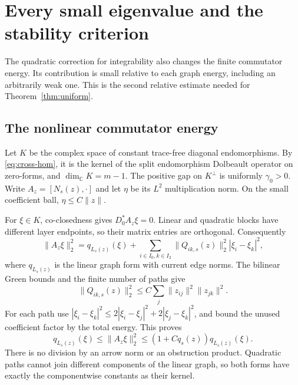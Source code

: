 \documentclass[11pt]{amsart}
\theoremstyle{definition}
\theoremstyle{remark}
\newcommand{\CC}{\mathbb C}
\begin{document}
\section{Every small eigenvalue and the stability criterion}\label{sec:spectrum}

The quadratic correction for integrability also changes the finite
commutator energy. Its contribution is small relative to each graph
energy, including an arbitrarily weak one. This is the second relative
estimate needed for Theorem~\ref{thm:uniform}.

\subsection{The nonlinear commutator energy}
Let $K$ be the complex space of constant trace-free diagonal
endomorphisms. By \eqref{eq:cross-hom}, it is the kernel of the split
endomorphism Dolbeault operator on zero-forms, and $\dim_\CC K=m-1$.
The positive gap on $K^\perp$ is uniformly $\gamma_0>0$. Write
$A_z=[N_s(z),\cdot]$ and let $\eta$ be its $L^2$ multiplication norm.
On the small coefficient ball, $\eta\le C\|z\|$.

For $\xi\in K$, co-closedness gives $D_0^*A_z\xi=0$. Linear and
quadratic blocks have different layer endpoints, so their matrix entries
are orthogonal. Consequently
\begin{equation}\label{eq:full-commutator}
 \|A_z\xi\|_2^2=q_{L_s(z)}(\xi)
 +\sum_{i\in I_0,k\in I_2}\|Q_{ik,s}(z)\|_2^2|\xi_i-\xi_k|^2,
\end{equation}
where $q_{L_s(z)}$ is the linear graph form with current edge norms.
The bilinear Green bounds and the finite number of paths give
\[
 \|Q_{ik,s}(z)\|_2^2
 \le C\sum_j\|z_{ij}\|^2\|z_{jk}\|^2.
\]
For each path use
$|\xi_i-\xi_k|^2\le2|\xi_i-\xi_j|^2+2|\xi_j-\xi_k|^2$,
and bound the unused coefficient factor by the total energy. This proves
\begin{equation}\label{eq:relative-nonlinear-energy}
 q_{L_s(z)}(\xi)\le\|A_z\xi\|_2^2
      \le(1+Cq_s(z))q_{L_s(z)}(\xi).
\end{equation}
There is no division by an arrow norm or an obstruction product. Quadratic
paths cannot join different components of the linear graph, so both forms
have exactly the componentwise constants as their kernel.
\end{document}
